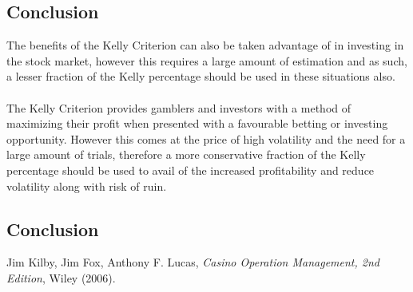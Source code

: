 \documentclass[12pt]{article}
\begin{document}
\subsection{Conclusion}
The benefits of the Kelly Criterion can also be taken advantage of in investing in the stock market, however this requires a large amount of estimation and as such, a lesser fraction of the Kelly percentage should be used in these situations also.
\\\\
The Kelly Criterion provides gamblers and investors with a method of maximizing their profit when presented with a favourable betting or investing opportunity. However this comes at the price of high volatility and the need for a large amount of trials, therefore a more conservative fraction of the Kelly percentage should be used to avail of the increased profitability and reduce volatility along with risk of ruin.
\subsection{Conclusion}
\begin{thebibliography}{3}
  Jim Kilby, Jim Fox, Anthony F. Lucas,
  \emph{Casino Operation Management, 2nd Edition},
  Wiley (2006).
\end{thebibliography}
\end{document}
